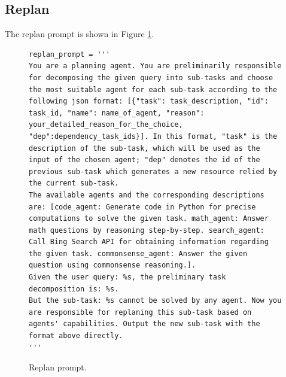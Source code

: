 \subsection{Replan}
\label{app_replan}
The replan prompt is shown in Figure \ref{replan}.
\begin{figure}[H]
\centering
\begin{lstlisting}[frame=single, basicstyle=\scriptsize\ttfamily, breaklines=true]
replan_prompt = '''
You are a planning agent. You are preliminarily responsible for decomposing the given query into sub-tasks and choose the most suitable agent for each sub-task according to the following json format: [{"task": task_description, "id": task_id, "name": name_of_agent, "reason": your_detailed_reason_for_the_choice, "dep":dependency_task_ids}]. In this format, "task" is the description of the sub-task, which will be used as the input of the chosen agent; "dep" denotes the id of the previous sub-task which generates a new resource relied by the current sub-task. 
The available agents and the corresponding descriptions are: [code_agent: Generate code in Python for precise computations to solve the given task. math_agent: Answer math questions by reasoning step-by-step. search_agent: Call Bing Search API for obtaining information regarding the given task. commonsense_agent: Answer the given question using commonsense reasoning.]. 
Given the user query: %s, the preliminary task decomposition is: %s.
But the sub-task: %s cannot be solved by any agent. Now you are responsible for replaning this sub-task based on agents' capabilities. Output the new sub-task with the format above directly.
'''
\end{lstlisting}
\caption{Replan prompt.}
\label{replan}
\end{figure}

